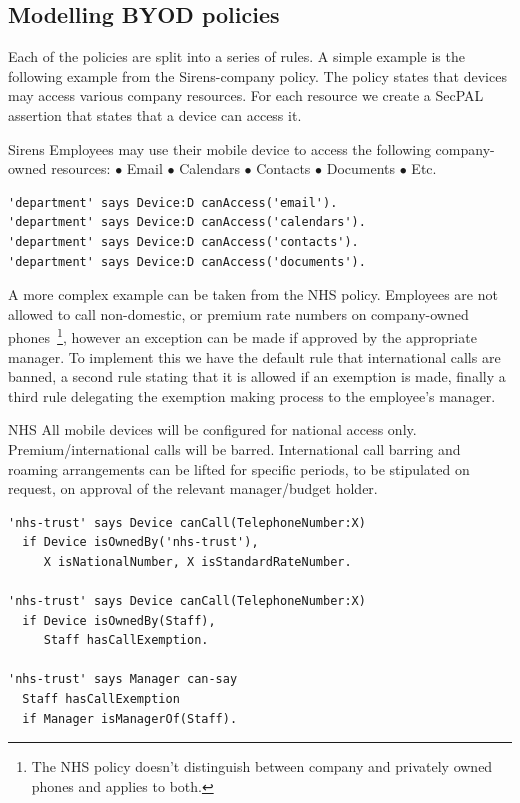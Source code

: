 \documentclass[thesis.tex]{subfiles}
\begin{document}
\subsection{Modelling BYOD policies}

Each of the policies are split into a series of rules. A simple example is the
following example from the Sirens-company policy. The policy states that devices
may access various company resources. For each resource we create a SecPAL
assertion that states that a device can access it.

\begin{policyrule}{Sirens}
  Employees may use their mobile device to access the following company-owned resources:
  \newline $\bullet$ Email $\bullet$ Calendars $\bullet$ Contacts $\bullet$ Documents $\bullet$ Etc.
  \normalfont
  \begin{lstlisting}
'department' says Device:D canAccess('email').
'department' says Device:D canAccess('calendars').
'department' says Device:D canAccess('contacts').
'department' says Device:D canAccess('documents').
  \end{lstlisting}
\end{policyrule}

A more complex example can be taken from the NHS policy. Employees are not
allowed to call non-domestic, or premium rate numbers on company-owned
phones~\footnote{The NHS policy doesn't distinguish between company and
privately owned phones and applies to both.}, however an exception can be made
if approved by the appropriate manager. To implement this we have the default
rule that international calls are banned, a second rule stating that it is
allowed if an exemption is made, finally a third rule delegating the exemption
making process to the employee's manager.

\begin{policyrule}{NHS}
  All mobile devices will be configured for national access only. Premium/international calls will be barred.
  International call barring and roaming arrangements can be lifted for specific periods, to be stipulated on request, on approval of the relevant manager/budget holder.
  \normalfont
  \begin{lstlisting}
'nhs-trust' says Device canCall(TelephoneNumber:X)
  if Device isOwnedBy('nhs-trust'),
     X isNationalNumber, X isStandardRateNumber.

'nhs-trust' says Device canCall(TelephoneNumber:X)
  if Device isOwnedBy(Staff),
     Staff hasCallExemption.

'nhs-trust' says Manager can-say
  Staff hasCallExemption
  if Manager isManagerOf(Staff).
  \end{lstlisting}
\end{policyrule}
\end{document}
